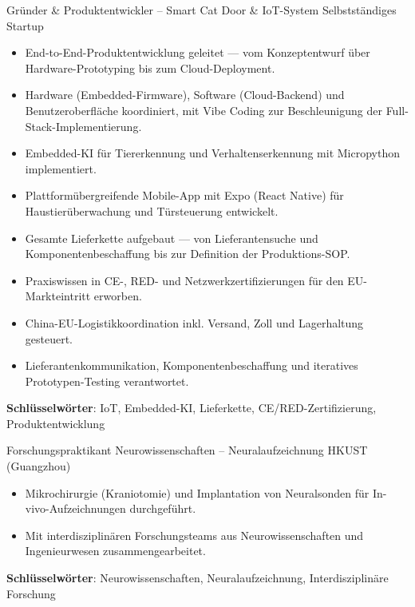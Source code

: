\documentclass[a4paper, serif, 10pt]{moderncv}
\begin{document}
        {Gründer \& Produktentwickler – Smart Cat Door \& IoT-System}
        {Selbstständiges Startup}
        {}
        {}
        {\begin{itemize}
\item End-to-End-Produktentwicklung geleitet — vom Konzeptentwurf über Hardware-Prototyping bis zum Cloud-Deployment.
\item Hardware (Embedded-Firmware), Software (Cloud-Backend) und Benutzeroberfläche koordiniert, mit Vibe Coding zur Beschleunigung der Full-Stack-Implementierung.
\item Embedded-KI für Tiererkennung und Verhaltenserkennung mit Micropython implementiert.
\item Plattformübergreifende Mobile-App mit Expo (React Native) für Haustierüberwachung und Türsteuerung entwickelt.
\item Gesamte Lieferkette aufgebaut — von Lieferantensuche und Komponentenbeschaffung bis zur Definition der Produktions-SOP.
\item Praxiswissen in CE-, RED- und Netzwerkzertifizierungen für den EU-Markteintritt erworben.
\item China-EU-Logistikkoordination inkl. Versand, Zoll und Lagerhaltung gesteuert.
\item Lieferantenkommunikation, Komponentenbeschaffung und iteratives Prototypen-Testing verantwortet.
\end{itemize}
\textbf{Schlüsselwörter}: IoT, Embedded-KI, Lieferkette, CE/RED-Zertifizierung, Produktentwicklung}

        {Forschungspraktikant Neurowissenschaften – Neuralaufzeichnung}
        {HKUST (Guangzhou)}
        {}
        {}
        {\begin{itemize}
\item Mikrochirurgie (Kraniotomie) und Implantation von Neuralsonden für In-vivo-Aufzeichnungen durchgeführt.
\item Mit interdisziplinären Forschungsteams aus Neurowissenschaften und Ingenieurwesen zusammengearbeitet.
\end{itemize}
\textbf{Schlüsselwörter}: Neurowissenschaften, Neuralaufzeichnung, Interdisziplinäre Forschung}
\end{document}
